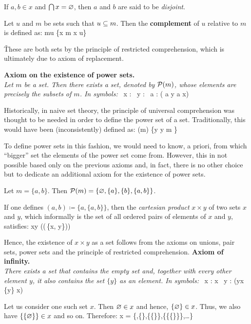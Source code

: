 If $a,b\in x$ and $\bigcap x = \varnothing$, then $a$ and $b$ are said to be \emph{disjoint}.
\ed

\bd [Complement]
Let $u$ and $m$ be sets such that $u \subseteq m$. Then the \textbf{complement} of $u$ relative to $m$ is defined as:
\bse
m\sm u \coloneqq \{x \in m \mid x \notin u\}
\ese

\v

These are both sets by the principle of restricted comprehension, which is ultimately due to axiom of replacement.
\ed

\textbf{Axiom on the existence of power sets.} \\
\emph{Let $m$ be a set. Then there exists a set, denoted by $\mathcal{P}(m)$, whose elements are precisely the subsets of $m$.
In symbols:}
\bse
\forall \, x : \exists \, y : \forall \, a : ( a \in y \eqv a \se x)
\ese

Historically, in naive set theory, the principle of universal comprehension was thought to be needed in order to
define the power set of a set. Traditionally, this would have been (inconsistently) defined as:
\bse
\cP (m) \coloneqq \{y \mid y \se m \}
\ese

To define power sets in this fashion, we would need to know, a priori, from which ``bigger'' set the elements of the
power set come from. However, this in not possible based only on the previous axioms and, in fact, there is no other
choice but to dedicate an additional axiom for the existence of power sets.

\be
Let $m = \{a,b\}$. Then $\mathcal{P}(m)=\{\varnothing,\{a\},\{b\},\{a,b\}\}$.
\ee

If one defines $\left(a,b\right) \coloneqq \{a,\{a,b\}\}$, then the \emph{cartesian product} $x \times y$ of two sets
$x$ and $y$, which informally is the set of all ordered pairs of elements of $x$ and $y$, satisfies:
\bse
x\times y \se \cP(\cP(\bigcup\,\{x, y\}))
\ese

Hence, the existence of $x\times y$ as a set follows from the axioms on unions, pair sets, power sets and the
principle of restricted comprehension. \v

\textbf{Axiom of infinity.} \\
\emph{There exists a set that contains the empty set and, together with every other element $y$, it also contains the
set $\{y\}$ as an element. In symbols:}
\bse
\exists \, x : \vn \in x \land \forall \, y : (y\in x \imp \{y\} \in x)
\ese

Let us consider one such set $x$. Then $\varnothing \in x$ and hence, $\{\varnothing\}\in x$. Thus, we also have $\{\{\varnothing\}\}\in x$
and so on. Therefore:
\bse
x = \{\vn,\{\vn\},\{\{\vn\}\},\{\{\{\vn\}\}\},\ldots\}
\ese

